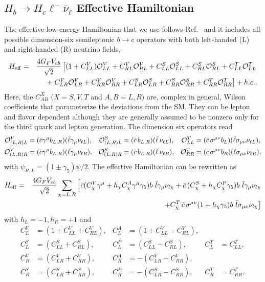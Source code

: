 \documentclass[aps,superscriptaddress,showpacs,nofootinbib,11pt]{revtex4-1}
\newcommand{\be}{\begin{equation}} \newcommand{\ee}{\end{equation}}
\newcommand{\bea}{\begin{eqnarray}} \newcommand{\eea}{\end{eqnarray}}
\begin{document}
\subsection{$H_b\to H_c\ell^-\bar\nu_\ell$ Effective Hamiltonian}
\label{sec:eh}
The effective low-energy Hamiltonian that we use follows Ref.~\cite{Mandal:2020htr} and  it 
includes  all possible dimension-six semileptonic $b\to c$ operators with both left-handed (L) 
 and right-handed (R)
neutrino fields,
%
\bea
H_{\rm eff}&=&\frac{4G_F V_{cb}}{\sqrt2}\left[(1+C^V_{LL}){\cal O}^V_{LL}+
C^V_{RL}{\cal O}^V_{RL}+C^S_{LL}{\cal O}^S_{LL}+C^S_{RL}{\cal O}^S_{RL}
+C^T_{LL}{\cal O}^T_{LL}\right.\nonumber \\
&&+\left. C^V_{LR}{\cal O}^V_{LR}+
C^V_{RR}{\cal O}^V_{RR}+C^S_{LR}{\cal O}^S_{LR}+C^S_{RR}{\cal O}^S_{RR}
+C^T_{RR}{\cal O}^T_{RR} \right]+h.c. .
\label{eq:hnp}
\eea
%
Here, the $C^X_{AB}$ ($X= S, V,T$ and 
$A,B=L,R$) are, complex in general, Wilson coefficients that parameterize 
the deviations from the SM.  They can 
 be lepton and flavor dependent although they  are generally assumed to be nonzero 
only for the third 
quark and lepton generation. The dimension six operators read
%
%
\begin{align}
\label{eq:hnp2L}
{\cal O}^V_{(L,R)L} &= (\bar c \gamma^\mu b_{L,R}) 
(\bar \ell \gamma_\mu \nu_{\ell L}), & {\cal O}^S_{(L,R)L} &= 
(\bar c\,  b_{L,R}) (\bar \ell \, \nu_{\ell L}), & {\cal O}^T_{LL} &= 
(\bar c\, \sigma^{\mu\nu} b_{L}) (\bar \ell \sigma_{\mu\nu} \nu_{\ell L}),\\
\label{eq:hnp2R}
{\cal O}^V_{(L,R)R} &= (\bar c \gamma^\mu b_{L,R}) 
(\bar \ell \gamma_\mu \nu_{\ell R}), &  {\cal O}^S_{(L,R)R} &= 
(\bar c\,  b_{L,R}) (\bar \ell \, \nu_{\ell R}), & {\cal O}^T_{RR} &= 
(\bar c\, \sigma^{\mu\nu} b_{R}) (\bar \ell \sigma_{\mu\nu} \nu_{\ell R}),
\end{align}
with $\psi_{R,L}= (1 \pm \gamma_5)\psi/2$.  The effective Hamiltonian can be rewritten as~\cite{Penalva:2021wye}
%
\bea
H_{\rm eff}&=&\frac{4G_F V_{cb}}{\sqrt2}\sum_{\chi=L,R}\Big[
\bar c(C_\chi^V\gamma^\mu+h_\chi C_\chi^A\gamma^\mu\gamma_5)b\ \bar l\gamma_\mu
\nu_{l\chi}+\bar c\,(C_\chi^S+h_\chi C_\chi^P\gamma_5)b\ \bar l\gamma_\mu
\nu_{l\chi}\nonumber\\
&&\hspace{3cm}+C_\chi^T\,\bar c\,\sigma^{\mu\nu}(1+h_\chi\gamma_5)b\ \bar l\sigma_{\mu\nu}\nu_{l\chi}\big]
\label{eq:eh2}
\eea
with $h_L=-1,h_R=+1$ and
\be
\begin{aligned}
C^V_L &= (1+C^V_{LL}+C^V_{RL}), & C^A_L &= (1+C^V_{LL}- C^V_{RL}), \\
C^S_L &= (C^S_{LL}+ C^S_{RL}), &
C^P_L &= (C^S_{LL}- C^S_{RL}), & C^T_L &= C^T_{LL}, \\
C^V_R &= (C^V_{LR}+ C^V_{RR}), & C^A_R &=-(C^V_{LR}- C^V_{RR}),\\
C^S_R &= (C^S_{LR}+ C^S_{RR}), &
C^P_R &=-(C^S_{LR}- C^S_{RR}), & C^T_R &= C^T_{RR}, 
\end{aligned}
\label{eq:WCR}
\ee
\end{document}
